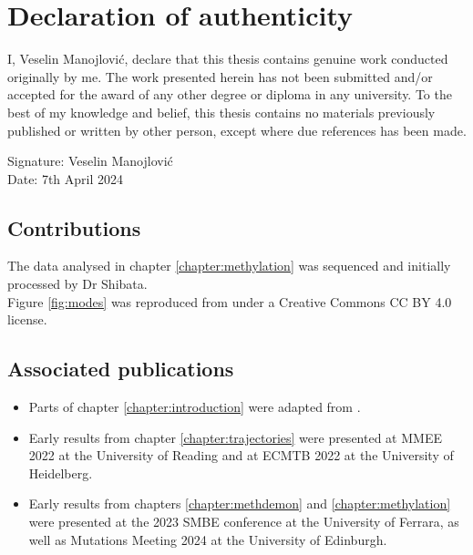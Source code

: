\chapter*{Declaration of authenticity}

I, Veselin Manojlovi\'c, declare that this thesis contains genuine work
conducted originally by me. The work presented herein has not been submitted
and/or accepted for the award of any other degree or diploma in any university.
To the best of my knowledge and belief, this thesis contains no materials
previously published or written by other person, except where due references
has been made.\par
Signature: Veselin Manojlovi\'c \\
Date: 7th April 2024

\section*{Contributions}
The data analysed in chapter \ref{chapter:methylation} was sequenced and
initially processed by Dr Shibata. \\

Figure \ref{fig:modes} was reproduced from \cite{davis_tumor_2017} under a
Creative Commons CC BY 4.0 license. \par

\section*{Associated publications}
\begin{itemize}
    \item Parts of chapter \ref{chapter:introduction} were adapted from
        \cite{lemant_robust_2022}.
    \item Early results from chapter \ref{chapter:trajectories} were presented
        at MMEE 2022 at the University of Reading and at ECMTB 2022 at the
        University of Heidelberg.
    \item Early results from chapters \ref{chapter:methdemon} and
        \ref{chapter:methylation} were presented at the 2023 SMBE conference at
        the University of Ferrara, as well as Mutations Meeting 2024 at the
        University of Edinburgh.
\end{itemize}
